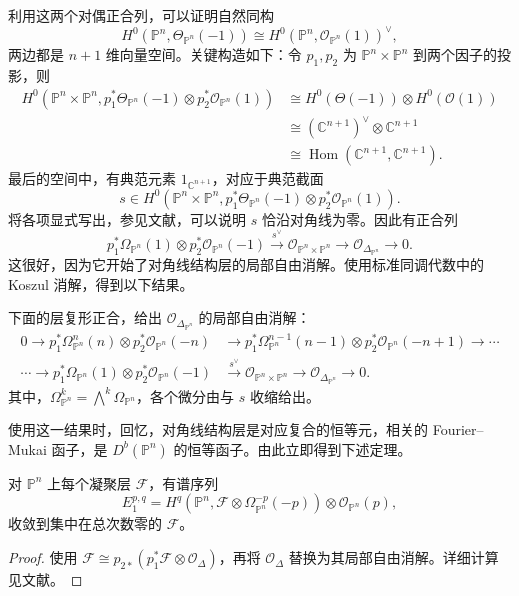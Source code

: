 利用这两个对偶正合列，可以证明自然同构
\[
H^0(\mathbb{P}^n,\Theta_{\mathbb{P}^n}(-1))
\cong H^0(\mathbb{P}^n,\mathcal{O}_{\mathbb{P}^n}(1))^{\vee},
\]
两边都是 $n+1$ 维向量空间。关键构造如下：令 $p_1,p_2$ 为 $\mathbb{P}^n\times\mathbb{P}^n$ 到两个因子的投影，则
\[
\begin{aligned}
H^0(\mathbb{P}^n\times\mathbb{P}^n,
p_1^*\Theta_{\mathbb{P}^n}(-1)\otimes p_2^*\mathcal{O}_{\mathbb{P}^n}(1))
&\cong H^0(\Theta(-1))\otimes H^0(\mathcal{O}(1))\\
&\cong(\mathbb{C}^{n+1})^{\vee}\otimes\mathbb{C}^{n+1}\\
&\cong\operatorname{Hom}(\mathbb{C}^{n+1},\mathbb{C}^{n+1}).
\end{aligned}
\]
最后的空间中，有典范元素 $1_{\mathbb{C}^{n+1}}$，对应于典范截面
\[
s\in H^0(\mathbb{P}^n\times\mathbb{P}^n,
p_1^*\Theta_{\mathbb{P}^n}(-1)\otimes p_2^*\mathcal{O}_{\mathbb{P}^n}(1)).
\]
将各项显式写出，参见文献，可以说明 $s$ 恰沿对角线为零。因此有正合列
\[
p_1^*\Omega_{\mathbb{P}^n}(1)\otimes p_2^*\mathcal{O}_{\mathbb{P}^n}(-1)
\xrightarrow{s^{\vee}}\mathcal{O}_{\mathbb{P}^n\times\mathbb{P}^n}
\longrightarrow\mathcal{O}_{\Delta_{\mathbb{P}^n}}\longrightarrow0.
\]
这很好，因为它开始了对角线结构层的局部自由消解。使用标准同调代数中的 Koszul 消解，得到以下结果。

\begin{proposition}\label{prop:4.71}
下面的层复形正合，给出 $\mathcal{O}_{\Delta_{\mathbb{P}^n}}$ 的局部自由消解：
\[
\begin{aligned}
0\longrightarrow p_1^*\Omega_{\mathbb{P}^n}^n(n)
\otimes p_2^*\mathcal{O}_{\mathbb{P}^n}(-n)
&\longrightarrow p_1^*\Omega_{\mathbb{P}^n}^{n-1}(n-1)
\otimes p_2^*\mathcal{O}_{\mathbb{P}^n}(-n+1)\longrightarrow\cdots\\
\cdots\longrightarrow p_1^*\Omega_{\mathbb{P}^n}(1)
\otimes p_2^*\mathcal{O}_{\mathbb{P}^n}(-1)
&\xrightarrow{s^{\vee}}\mathcal{O}_{\mathbb{P}^n\times\mathbb{P}^n}
\longrightarrow\mathcal{O}_{\Delta_{\mathbb{P}^n}}\longrightarrow0.
\end{aligned}
\]
其中，$\Omega^k_{\mathbb{P}^n}=\bigwedge^k\Omega_{\mathbb{P}^n}$，各个微分由与 $s$ 收缩给出。
\end{proposition}

使用这一结果时，回忆，对角线结构层是对应复合的恒等元，相关的 Fourier--Mukai 函子，是 $D^b(\mathbb{P}^n)$ 的恒等函子。由此立即得到下述定理。
\begin{theorem}[Beilinson 定理]\label{thm:4.72}
对 $\mathbb{P}^n$ 上每个凝聚层 $\mathcal{F}$，有谱序列
\[
E_1^{p,q}=H^q(\mathbb{P}^n,
\mathcal{F}\otimes\Omega_{\mathbb{P}^n}^{-p}(-p))
\otimes\mathcal{O}_{\mathbb{P}^n}(p),
\]
收敛到集中在总次数零的 $\mathcal{F}$。
\end{theorem}
\begin{proof}
使用 $\mathcal{F}\cong p_{2*}(p_1^*\mathcal{F}\otimes\mathcal{O}_\Delta)$，再将 $\mathcal{O}_\Delta$ 替换为其局部自由消解。详细计算见文献。\BookQED
\end{proof}

